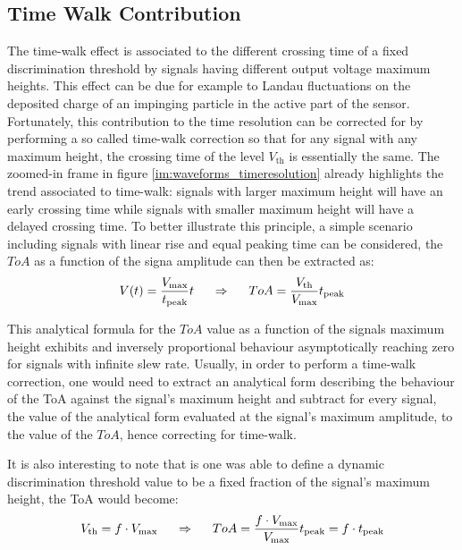 		\subsection{Time Walk Contribution}
		The time-walk effect is associated to the different crossing time of a fixed discrimination threshold by signals having different output voltage maximum heights. This effect can be due for example to Landau fluctuations on the deposited charge of an impinging particle in the active part of the sensor. Fortunately, this contribution to the time resolution can be corrected for by performing a so called time-walk correction so that for any signal with any maximum height, the crossing time of the level $V_{\text{th}}$ is essentially the same. The zoomed-in frame in figure \ref{im:waveforms_timeresolution} already highlights the trend associated to time-walk: signals with larger maximum height will have an early crossing time while signals with smaller maximum height will have a delayed crossing time. To better illustrate this principle, a simple scenario including signals with linear rise and equal peaking time can be considered, the $ToA$ as a function of the signa amplitude can then be extracted as: 
		\begin{equation}
			V(t) = \frac{V_{\text{max}}}{t_{\text{peak}}} t \hspace{5mm} \Rightarrow \hspace{5mm} ToA = \frac{V_{\text{th}}}{V_{\text{max}}} t_{\text{peak}}
		\end{equation}
		
		This analytical formula for the $ToA$ value as a function of the signals maximum height exhibits and inversely proportional behaviour asymptotically reaching zero for signals with infinite slew rate. Usually, in order to perform a time-walk correction, one would need to extract an analytical form describing the behaviour of the ToA against the signal's maximum height and subtract for every signal, the value of the analytical form evaluated at the signal's maximum amplitude, to the value of the $ToA$, hence correcting for time-walk. 
		
		It is also interesting to note that is one was able to define a dynamic discrimination threshold value to be a fixed fraction of the signal's maximum height, the ToA would become: 
		\begin{equation}
			V_{\text{th}} = f \cdot V_{\text{max}} \hspace{5mm} \Rightarrow \hspace{5mm} ToA = \frac{f \cdot V_{\text{max}}}{V_{\text{max}}} t_{\text{peak}} = f \cdot t_{\text{peak}} 
		\end{equation}
		
